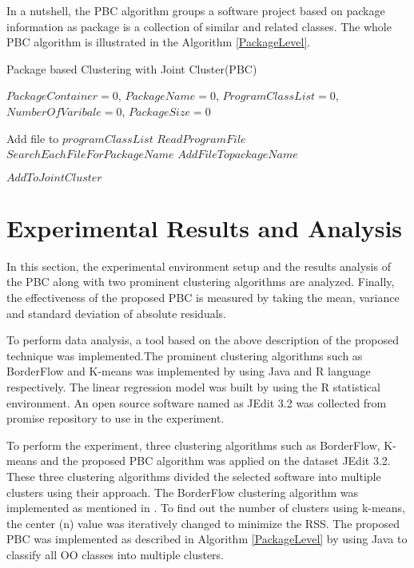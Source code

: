 \documentclass[12pt]{report}
\begin{document}
In a nutshell, the PBC algorithm groups a software project based on package information as package is a collection of similar and related classes. The whole PBC algorithm is illustrated in the Algorithm \ref{PackageLevel}.

\begin{algorithm}
\caption{Package based Clustering with Joint Cluster(PBC)}
\label{PackageLevel}
\begin{algorithmic}[1]
\REQUIRE $PackageContainer = 0$, $ PackageName = 0$, $ ProgramClassList = 0$, $NumberOfVaribale = 0$, $PackageSize = 0$

				\STATE Add file to $programClassList$
		\ENDIF
	\ENDFOR
{}
			\STATE $Read Program File$ 
			\STATE $Search Each File For PackageName $  
				\STATE $Add File To packageName$
			\ELSE{  }
			\ENDIF
	\ENDFOR
	
			\STATE $Add To Joint Cluster$
		\ENDIF
	\ENDFOR
\end{algorithmic}
\end{algorithm}
 

\section{Experimental Results and Analysis }

In this section, the experimental environment setup and the results analysis of the PBC along with two prominent clustering algorithms are analyzed. Finally, the effectiveness of the proposed PBC is measured by taking the mean, variance and standard deviation of absolute residuals. 

To perform data analysis, a tool based on the above description of the proposed technique was implemented.The prominent clustering algorithms such as BorderFlow and K-means was implemented by using Java and R language respectively. The linear regression model was built by using the R statistical environment. An open source software named as JEdit 3.2 was collected from promise repository \cite{promise12} to use in the experiment.

To perform the experiment, three clustering algorithms such as BorderFlow, K-means and the proposed PBC algorithm was applied on the dataset JEdit 3.2. These three clustering algorithms divided the selected software into multiple clusters using their approach. The BorderFlow clustering algorithm was implemented as mentioned in \cite{scanniello2013class}. To find out the number of clusters using k-means, the center (n) value was iteratively changed to minimize the RSS. The proposed PBC was implemented as described in Algorithm \ref{PackageLevel} by using Java to classify all OO classes into multiple clusters.
\end{document}
